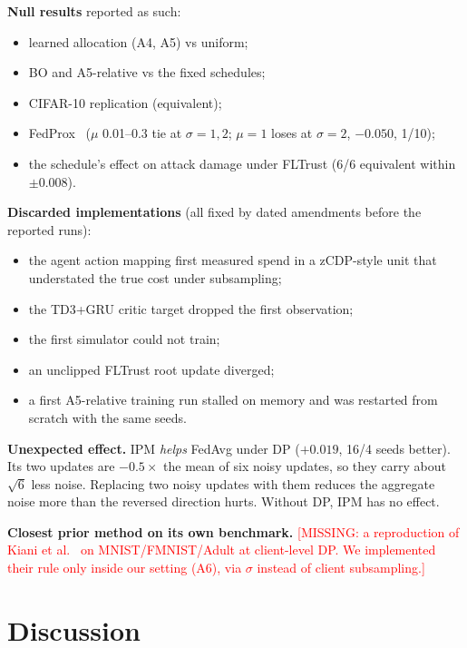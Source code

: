 \documentclass[journal]{IEEEtran}
\newcommand{\missing}[1]{\textcolor{red}{[MISSING: #1]}}
\begin{document}
\textbf{Null results} reported as such:
\begin{itemize}
  \item learned allocation (A4, A5) vs uniform;
  \item BO and A5-relative vs the fixed schedules;
  \item CIFAR-10 replication (equivalent);
  \item FedProx~\cite{li2020fedprox} ($\mu$ 0.01--0.3 tie at $\sigma = 1, 2$; $\mu = 1$ loses at $\sigma = 2$, $-0.050$, 1/10);
  \item the schedule's effect on attack damage under FLTrust (6/6 equivalent within $\pm0.008$).
\end{itemize}

\textbf{Discarded implementations} (all fixed by dated amendments before the reported runs):
\begin{itemize}
  \item the agent action mapping first measured spend in a zCDP-style unit that understated the true
  cost under subsampling;
  \item the TD3+GRU critic target dropped the first observation;
  \item the first simulator could not train;
  \item an unclipped FLTrust root update diverged;
  \item a first A5-relative training run stalled on memory and was restarted from scratch with the
  same seeds.
\end{itemize}

\textbf{Unexpected effect.} IPM \emph{helps} FedAvg under DP ($+0.019$, 16/4 seeds better). Its two
updates are $-0.5\times$ the mean of six noisy updates, so they carry about $\sqrt{6}$ less noise.
Replacing two noisy updates with them reduces the aggregate noise more than the reversed direction
hurts. Without DP, IPM has no effect.

\textbf{Closest prior method on its own benchmark.} \missing{a reproduction of Kiani et
al.~\cite{kiani2025timeadaptive} on MNIST/FMNIST/Adult at client-level DP. We implemented their rule
only inside our setting (A6), via $\sigma$ instead of client subsampling.}

\section{Discussion}
\label{sec:discussion}
\end{document}
